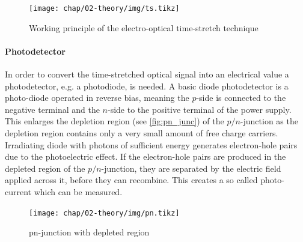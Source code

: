 \begin{figure}[H]
	\centering
	\texttt{[image: chap/02-theory/img/ts.tikz]}
	\caption{Working principle of the electro-optical time-stretch technique \cite{roussel2014}}
	\label{fig:eo_ts}
\end{figure}

\paragraph{Photodetector}
In order to convert the time-stretched optical signal into an electrical value a photodetector, e.g. a photodiode, is needed.
A basic diode photodetector is a photo-diode operated in reverse bias, meaning the $p$-side is connected to the negative terminal and the $n$-side to the positive terminal of the power supply. %
This enlarges the depletion region (see \autoref{fig:pn_junc}) of the $p/n$-junction as the depletion region contains only a very small amount of free charge carriers. 
Irradiating diode with photons of sufficient energy generates electron-hole pairs due to the photoelectric effect. %
If the electron-hole pairs are produced in the depleted region of the $p/n$-junction, they are separated by the electric field applied across it, before they can recombine. 
This creates a so called photo-current which can be measured. \cite{photodiode} %

\begin{figure}[tb]
	\centering
	\texttt{[image: chap/02-theory/img/pn.tikz]}
	\caption{pn-junction with depleted region \cite{pn-junc}}
	\label{fig:pn_junc}
\end{figure}


